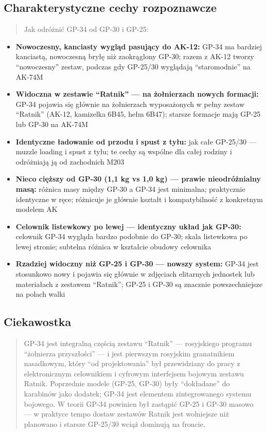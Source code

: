 \documentclass[12pt,oneside]{book}
\providecommand{\tightlist}{%
  \setlength{\itemsep}{0pt}\setlength{\parskip}{0pt}}
\begin{document}
\subsection{Charakterystyczne cechy
rozpoznawcze}\label{charakterystyczne-cechy-rozpoznawcze-96}

\begin{quote}
Jak odróżnić GP-34 od GP-30 i GP-25:
\end{quote}

\begin{itemize}
\tightlist
\item
  \textbf{Nowoczesny, kanciasty wygląd pasujący do AK-12:} GP-34 ma
  bardziej kanciastą, nowoczesną bryłę niż zaokrąglony GP-30; razem z
  AK-12 tworzy ``nowoczesny'' zestaw, podczas gdy GP-25/30 wyglądają
  ``staromodnie'' na AK-74M
\item
  \textbf{Widoczna w zestawie ``Ratnik'' --- na żołnierzach nowych
  formacji:} GP-34 pojawia się głównie na żołnierzach wyposażonych w
  pełny zestaw ``Ratnik'' (AK-12, kamizelka 6B45, hełm 6B47); starsze
  formacje mają GP-25 lub GP-30 na AK-74M
\item
  \textbf{Identyczne ładowanie od przodu i spust z tyłu:} jak całe
  GP-25/30 --- muzzle loading i spust z tyłu; te cechy są wspólne dla
  całej rodziny i odróżniają ją od zachodnich M203
\item
  \textbf{Nieco cięższy od GP-30 (1,1 kg vs 1,0 kg) --- prawie
  nieodróżnialny masą:} różnica masy między GP-30 a GP-34 jest
  minimalna; praktycznie identyczne w ręce; różnicuje je głównie kształt
  i kompatybilność z konkretnym modelem AK
\item
  \textbf{Celownik listewkowy po lewej --- identyczny układ jak GP-30:}
  celownik GP-34 wygląda bardzo podobnie do GP-30; skala listewkowa po
  lewej stronie; subtelna różnica w kształcie obudowy celownika
\item
  \textbf{Rzadziej widoczny niż GP-25 i GP-30 --- nowszy system:} GP-34
  jest stosunkowo nowy i pojawia się głównie w zdjęciach elitarnych
  jednostek lub materiałach z zestawem ``Ratnik''; GP-25 i GP-30 są
  znacznie powszechniejsze na polach walki
\end{itemize}

\subsection{Ciekawostka}\label{ciekawostka-96}

\begin{quote}
GP-34 jest integralną częścią zestawu ``Ratnik'' --- rosyjskiego
programu ``żołnierza przyszłości'' --- i jest pierwszym rosyjskim
granatnikiem nasadkowym, który ``od projektowania'' był przewidziany do
pracy z elektronicznym celownikiem i cyfrowym interfejsem bojowym
zestawu Ratnik. Poprzednie modele (GP-25, GP-30) były ``dokładane'' do
karabinów jako dodatek; GP-34 jest elementem zintegrowanego systemu
bojowego. W teorii GP-34 powinien był zastąpić GP-25 i GP-30 masowo ---
w praktyce tempo dostaw zestawów Ratnik jest wolniejsze niż planowano i
starsze GP-25/30 wciąż dominują na froncie.
\end{quote}
\end{document}
